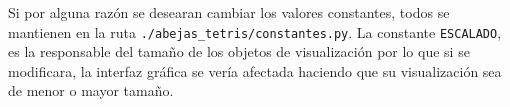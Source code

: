 Si por alguna razón se desearan cambiar los valores constantes, todos se mantienen 
en la ruta \texttt{./abejas\_tetris/constantes.py}. La constante \texttt{ESCALADO}, 
es la responsable del tamaño de los objetos de visualización por lo que si se modificara, 
la interfaz gráfica se vería afectada haciendo que su visualización sea de menor o mayor tamaño.


